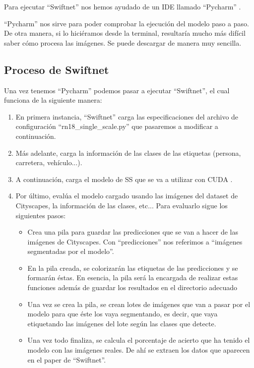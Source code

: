 Para ejecutar ``Swiftnet'' nos hemos ayudado de un \ac{IDE} llamado ``Pycharm'' \cite{pycharm}.

``Pycharm'' nos sirve para poder comprobar la ejecución del modelo paso a paso. De otra manera, si lo hiciéramos desde la terminal, resultaría mucho más difícil saber cómo procesa las imágenes. Se puede descargar de manera muy sencilla.

\subsection{Proceso de Swiftnet}

Una vez tenemos ``Pycharm'' podemos pasar a ejecutar ``Swiftnet'', el cual funciona de la siguiente manera:

\begin{enumerate}
\item En primera instancia, ``Swiftnet'' carga las especificaciones del archivo de configuración ``rn18\_single\_scale.py'' que pasaremos a modificar a continuación.
\item Más adelante, carga la información de las clases de las etiquetas (persona, carretera, vehículo...).
\item A continuación, carga el modelo de \ac{SS} que se va a utilizar con CUDA \cite{cuda}.
\item Por último, evalúa el modelo cargado usando las imágenes del dataset de Cityscapes, la información de las clases, etc... Para evaluarlo sigue los siguientes pasos:

\begin{itemize}
\item Crea una pila para guardar las predicciones que se van a hacer de las imágenes de Cityscapes. Con ``predicciones'' nos referimos a ``imágenes segmentadas por el modelo''.
\item En la pila creada, se colorizarán las etiquetas de las predicciones y se formarán éstas. En esencia, la pila será la encargada de realizar estas funciones además de guardar los resultados en el directorio adecuado
\item Una vez se crea la pila, se crean lotes de imágenes que van a pasar por el modelo para que éste los vaya segmentando, es decir, que vaya etiquetando las imágenes del lote según las clases que detecte.
\item Una vez todo finaliza, se calcula el porcentaje de acierto que ha tenido el modelo con las imágenes reales. De ahí se extraen los datos que aparecen en el paper de ``Swiftnet''.
\end{itemize}   
\end{enumerate}

